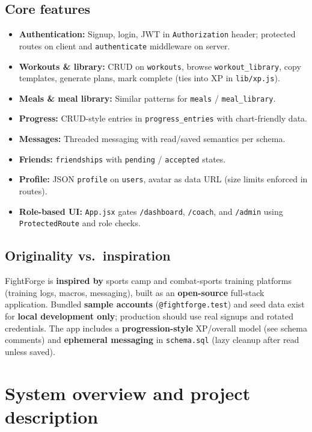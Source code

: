 \documentclass[11pt,letterpaper]{article}
\begin{document}
\subsection{Core features}
\begin{itemize}[nosep]
  \item \textbf{Authentication:} Signup, login, JWT in \texttt{Authorization} header; protected routes on client and \texttt{authenticate} middleware on server.
  \item \textbf{Workouts \& library:} CRUD on \texttt{workouts}, browse \texttt{workout\_library}, copy templates, generate plans, mark complete (ties into XP in \texttt{lib/xp.js}).
  \item \textbf{Meals \& meal library:} Similar patterns for \texttt{meals} / \texttt{meal\_library}.
  \item \textbf{Progress:} CRUD-style entries in \texttt{progress\_entries} with chart-friendly data.
  \item \textbf{Messages:} Threaded messaging with read/saved semantics per schema.
  \item \textbf{Friends:} \texttt{friendships} with \texttt{pending} / \texttt{accepted} states.
  \item \textbf{Profile:} JSON \texttt{profile} on \texttt{users}, avatar as data URL (size limits enforced in routes).
  \item \textbf{Role-based UI:} \texttt{App.jsx} gates \texttt{/dashboard}, \texttt{/coach}, and \texttt{/admin} using \texttt{ProtectedRoute} and role checks.
\end{itemize}

\subsection{Originality vs.\ inspiration}
FightForge is \textbf{inspired by} sports camp and combat-sports training platforms (training logs, macros, messaging), built as an \textbf{open-source} full-stack application. Bundled \textbf{sample accounts} (\texttt{@fightforge.test}) and seed data exist for \textbf{local development only}; production should use real signups and rotated credentials. The app includes a \textbf{progression-style} XP/overall model (see schema comments) and \textbf{ephemeral messaging} in \texttt{schema.sql} (lazy cleanup after read unless saved).

\section{System overview and project description}
\end{document}

